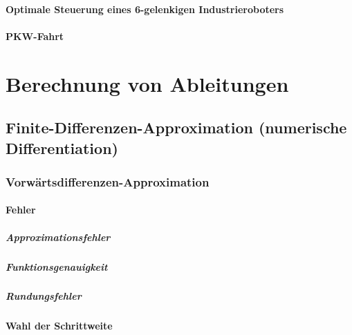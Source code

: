 			\subsubsection{Optimale Steuerung eines 6-gelenkigen Industrieroboters} %

			\subsubsection{PKW-Fahrt} %

\chapter{Berechnung von Ableitungen} %

	\section{Finite-Differenzen-Approximation (numerische Differentiation)} %

		\subsection{Vorwärtsdifferenzen-Approximation} %

			\subsubsection{Fehler} %

				\paragraph{Approximationsfehler} %

				\paragraph{Funktionsgenauigkeit} %

				\paragraph{Rundungsfehler} %

			\subsubsection{Wahl der Schrittweite} %

